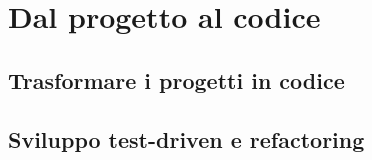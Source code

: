 \chapter{Dal progetto al codice}

\section{Trasformare i progetti in codice}

\section{Sviluppo test-driven e refactoring}